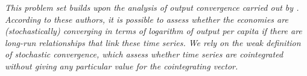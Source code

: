 \textit{This problem set builds upon the analysis of output convergence carried out by \citet{bernard1995convergence}. According to these authors, it is possible to assess whether the economies are (stochastically)
converging in terms of logarithm of output per capita if there are long-run relationships that link these
time series. We rely on the weak definition of stochastic convergence, which assess whether time series
are cointegrated without giving any particular value for the cointegrating vector.}
